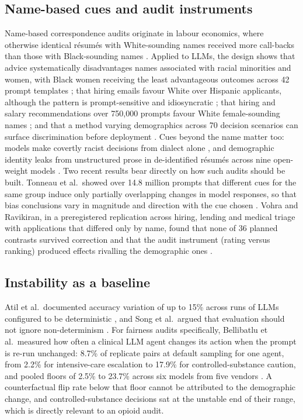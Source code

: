 \subsection{Name-based cues and audit instruments}
Name-based correspondence audits originate in labour economics, where otherwise
identical r\'esum\'es with White-sounding names received more call-backs than
those with Black-sounding names \cite{bertrand2004emily}. Applied to LLMs, the
design shows that advice systematically disadvantages names associated with
racial minorities and women, with Black women receiving the least advantageous
outcomes across 42 prompt templates \cite{salinas2024name}; that hiring emails
favour White over Hispanic applicants, although the pattern is prompt-sensitive
and idiosyncratic \cite{an2024hiring}; that hiring and salary recommendations
over 750,000 prompts favour White female-sounding names \cite{nghiem2024gotta};
and that a method varying demographics across 70 decision scenarios can surface
discrimination before deployment \cite{tamkin2023evaluating}. Cues beyond the
name matter too: models make covertly racist decisions from dialect alone
\cite{hofmann2024dialect}, and demographic identity leaks from unstructured
prose in de-identified r\'esum\'es across nine open-weight models
\cite{chen2026beyond}. Two recent results bear directly on how such audits
should be built. Tonneau et al.\ showed over 14.8 million prompts that different
cues for the same group induce only partially overlapping changes in model
responses, so that bias conclusions vary in magnitude and direction with the
cue chosen \cite{tonneau2026cues}. Vohra and Ravikiran, in a preregistered
replication across hiring, lending and medical triage with applications that
differed only by name, found that none of 36 planned contrasts survived
correction and that the audit instrument (rating versus ranking) produced
effects rivalling the demographic ones \cite{vohra2026audit}.

\subsection{Instability as a baseline}
Atil et al.\ documented accuracy variation of up to 15\% across runs of LLMs
configured to be deterministic \cite{atil2024nondeterminism}, and Song et al.\
argued that evaluation should not ignore non-determinism \cite{song2025good}.
For fairness audits specifically, Bellibatlu et al.\ measured how often a
clinical LLM agent changes its action when the prompt is re-run unchanged: 8.7\%
of replicate pairs at default sampling for one agent, from 2.2\% for
intensive-care escalation to 17.9\% for controlled-substance caution, and pooled
floors of 2.5\% to 23.7\% across six models from five vendors
\cite{bellibatlu2026instability}. A counterfactual flip rate below that floor
cannot be attributed to the demographic change, and controlled-substance
decisions sat at the unstable end of their range, which is directly relevant to
an opioid audit.

